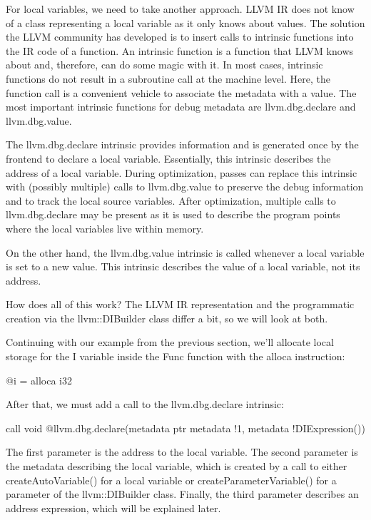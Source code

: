 For local variables, we need to take another approach. LLVM IR does not know of a class representing a local variable as it only knows about values. The solution the LLVM community has developed is to insert calls to intrinsic functions into the IR code of a function. An intrinsic function is a function that LLVM knows about and, therefore, can do some magic with it. In most cases, intrinsic functions do not result in a subroutine call at the machine level. Here, the function call is a convenient vehicle to associate the metadata with a value. The most important intrinsic functions for debug metadata are llvm.dbg.declare and llvm.dbg.value.

The llvm.dbg.declare intrinsic provides information and is generated once by the frontend to declare a local variable. Essentially, this intrinsic describes the address of a local variable. During optimization, passes can replace this intrinsic with (possibly multiple) calls to llvm.dbg.value to preserve the debug information and to track the local source variables. After optimization, multiple calls to llvm.dbg.declare may be present as it is used to describe the program points where the local variables live within memory.

On the other hand, the llvm.dbg.value intrinsic is called whenever a local variable is set to a new value. This intrinsic describes the value of a local variable, not its address.

How does all of this work? The LLVM IR representation and the programmatic creation via the llvm::DIBuilder class differ a bit, so we will look at both.

Continuing with our example from the previous section, we’ll allocate local storage for the I variable inside the Func function with the alloca instruction:

\begin{shell}
@i = alloca i32
\end{shell}

After that, we must add a call to the llvm.dbg.declare intrinsic:

\begin{shell}
call void @llvm.dbg.declare(metadata ptr %
                metadata !1, metadata !DIExpression())
\end{shell}

The first parameter is the address to the local variable. The second parameter is the metadata describing the local variable, which is created by a call to either createAutoVariable() for a local variable or createParameterVariable() for a parameter of the llvm::DIBuilder class. Finally, the third parameter describes an address expression, which will be explained later.

